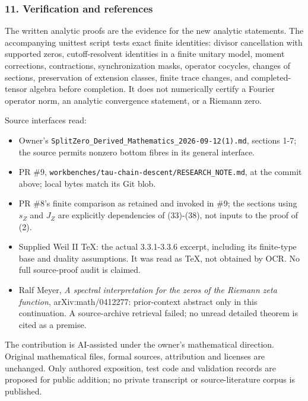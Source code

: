 \subsubsection{11. Verification and references}\label{pr_10:verification-and-references}

The written analytic proofs are the evidence for the new analytic statements. The accompanying
unittest script tests exact finite identities: divisor cancellation with supported zeros,
cutoff-resolvent identities in a finite unitary model, moment corrections, contractions,
synchronization masks, operator cocycles, changes of sections, preservation of extension classes,
finite trace changes, and completed-tensor algebra before completion. It does not numerically
certify a Fourier operator norm, an analytic convergence statement, or a Riemann zero.

Source interfaces read:

\begin{itemize}
\tightlist
\item
  Owner's \nolinkurl{SplitZero_Derived_Mathematics_2026-09-12(1).md}, sections 1-7; the source
  permits nonzero bottom fibres in its general interface.
\item
  PR \#9, \nolinkurl{workbenches/tau-chain-descent/RESEARCH_NOTE.md}, at the commit above; local bytes
  match its Git blob.
\item
  PR \#8's finite comparison as retained and invoked in \#9; the sections using \(s_Z\) and \(J_Z\)
  are explicitly dependencies of (33)-(38), not inputs to the proof of (2).
\item
  Supplied Weil II TeX: the actual 3.3.1-3.3.6 excerpt, including its finite-type base and duality
  assumptions. It was read as TeX, not obtained by OCR. No full source-proof audit is claimed.
\item
  Ralf Meyer, \emph{A spectral interpretation for the zeros of the Riemann zeta function},
  arXiv:math/0412277: prior-context abstract only in this continuation. A source-archive retrieval
  failed; no unread detailed theorem is cited as a premise.
\end{itemize}

The contribution is AI-assisted under the owner's mathematical direction. Original mathematical
files, formal sources, attribution and licenses are unchanged. Only authored exposition, test code
and validation records are proposed for public addition; no private transcript or source-literature
corpus is published.
